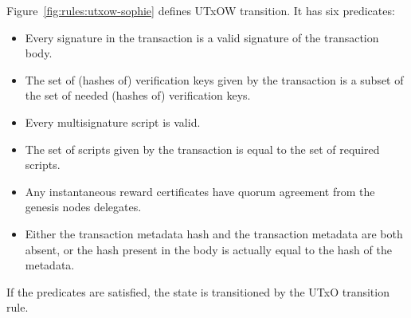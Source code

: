 Figure~\ref{fig:rules:utxow-sophie} defines UTxOW transition.
It has six predicates:
\begin{itemize}
  \item Every signature in the transaction is a valid signature of the transaction body.
  \item The set of (hashes of) verification keys given by the transaction is a subset of
    the set of needed (hashes of) verification keys.
  \item Every multisignature script is valid.
  \item The set of scripts given by the transaction is equal to the set of required scripts.
  \item Any instantaneous reward certificates have quorum agreement from the genesis nodes delegates.
  \item Either the transaction metadata hash and the transaction metadata are both absent,
    or the hash present in the body is actually equal to the hash of the metadata.
\end{itemize}
If the predicates are satisfied, the state is transitioned by the UTxO transition rule.

